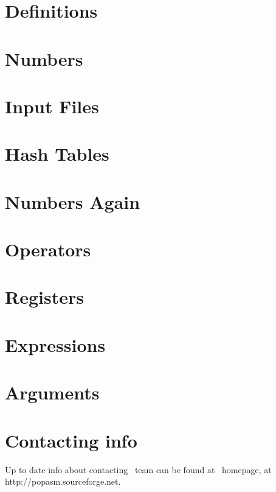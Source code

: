 \documentclass[a4paper,draft,12pt]{book}
\begin{document}
\chapter{Definitions\label{chaprefs}}

\chapter{Numbers\label{chapnums}}

\chapter{Input Files\label{chapinp}}

\chapter{Hash Tables\label{chaphash}}

\chapter{Numbers Again\label{chapnumsagain}}

\chapter{Operators\label{chapops}}

\chapter{Registers\label{chapregs}}

\chapter{Expressions\label{chapexps}}

\chapter{Arguments\label{chapargs}}


\appendix

\chapter{Contacting info\label{CONTACT}}
Up to date info about contacting \popasm\ team can be found at \popasm\ 
homepage, at http://popasm.sourceforge.net.
\end{document}
